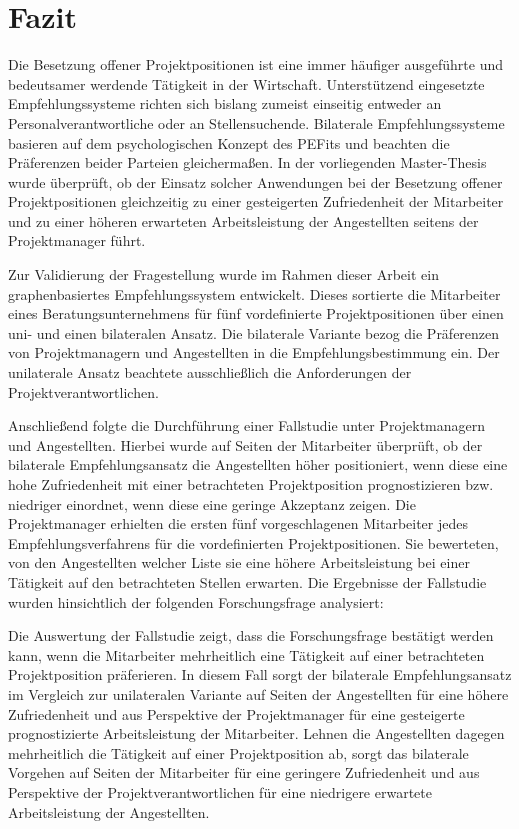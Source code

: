 \chapter{Fazit}
\label{ch:fazit}
Die Besetzung offener Projektpositionen ist eine immer häufiger ausgeführte und bedeutsamer werdende Tätigkeit in der Wirtschaft. Unterstützend eingesetzte Empfehlungssysteme richten sich bislang zumeist einseitig entweder an Personalverantwortliche oder an Stellensuchende. Bilaterale Empfehlungssysteme basieren auf dem psychologischen Konzept des \aclp{PEFit} und beachten die Präferenzen beider Parteien gleichermaßen. In der vorliegenden Master-Thesis wurde überprüft, ob der Einsatz solcher Anwendungen bei der Besetzung offener Projektpositionen gleichzeitig zu einer gesteigerten Zufriedenheit der Mitarbeiter und zu einer höheren erwarteten Arbeitsleistung der Angestellten seitens der Projektmanager führt. 

Zur Validierung der Fragestellung wurde im Rahmen dieser Arbeit ein graphenbasiertes Empfehlungssystem entwickelt. Dieses sortierte die Mitarbeiter eines Beratungsunternehmens für fünf vordefinierte Projektpositionen über einen uni- und einen bilateralen Ansatz. Die bilaterale Variante bezog die Präferenzen von Projektmanagern und Angestellten in die Empfehlungsbestimmung ein. Der unilaterale Ansatz beachtete ausschließlich die Anforderungen der Projektverantwortlichen.

Anschließend folgte die Durchführung einer Fallstudie unter Projektmanagern und Angestellten. Hierbei wurde auf Seiten der Mitarbeiter überprüft, ob der bilaterale Empfehlungsansatz die Angestellten höher positioniert, wenn diese eine hohe Zufriedenheit mit einer betrachteten Projektposition prognostizieren bzw. niedriger einordnet, wenn diese eine geringe Akzeptanz zeigen. Die Projektmanager erhielten die ersten fünf vorgeschlagenen Mitarbeiter jedes Empfehlungsverfahrens für die vordefinierten Projektpositionen. Sie bewerteten, von den Angestellten welcher Liste sie eine höhere Arbeitsleistung bei einer Tätigkeit auf den betrachteten Stellen erwarten. Die Ergebnisse der Fallstudie wurden hinsichtlich der folgenden Forschungsfrage analysiert: \forschungsfrage

Die Auswertung der Fallstudie zeigt, dass die Forschungsfrage bestätigt werden kann, wenn die Mitarbeiter mehrheitlich eine Tätigkeit auf einer betrachteten Projektposition präferieren. In diesem Fall sorgt der bilaterale Empfehlungsansatz im Vergleich zur unilateralen Variante auf Seiten der Angestellten für eine höhere Zufriedenheit und aus Perspektive der Projektmanager für eine gesteigerte prognostizierte Arbeitsleistung der Mitarbeiter. Lehnen die Angestellten dagegen mehrheitlich die Tätigkeit auf einer Projektposition ab, sorgt das bilaterale Vorgehen auf Seiten der Mitarbeiter für eine geringere Zufriedenheit und aus Perspektive der Projektverantwortlichen für eine niedrigere erwartete Arbeitsleistung der Angestellten.


